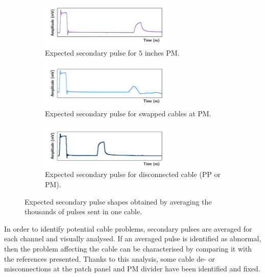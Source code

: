 \begin{figure}[h!]
  \centering
  \begin{subfigure}[b]{1\textwidth}
    \centering
    \includegraphics[width=0.7\textwidth]{commissioning/fig_commissioning/normal_pulse_5.pdf}
    \captionsetup{justification=centering}
    \caption{Expected secondary pulse for $5$ inches PM.
      \label{subfig:normal_5}}
  \end{subfigure}
  \begin{subfigure}[b]{1\textwidth}
    \centering
    \includegraphics[width=0.7\textwidth]{commissioning/fig_commissioning/anormal_pulse.pdf}
    \captionsetup{justification=centering}
    \caption{Expected secondary pulse for swapped cables at PM.
      \label{subfig:}}
  \end{subfigure}
  \begin{subfigure}[b]{1\textwidth}
    \centering
    \includegraphics[width=0.7\textwidth]{commissioning/fig_commissioning/anormal_pulse_misco.pdf}
    \captionsetup{justification=centering}
    \caption{Expected secondary pulse for disconnected cable (PP or PM).
      \label{subfig:}}
  \end{subfigure}
  \caption{Expected secondary pulse shapes obtained by averaging the thousands of pulses sent in one cable.
    \label{fig:}}
\end{figure}

In order to identify potential cable problems, secondary pulses are averaged for each channel and visually analysed.
If an averaged pulse is identified as abnormal, then the problem affecting the cable can be characterised by comparing it with the references presented.
Thanks to this analysis, some cable de- or misconnections at the patch panel and PM divider have been identified and fixed.

